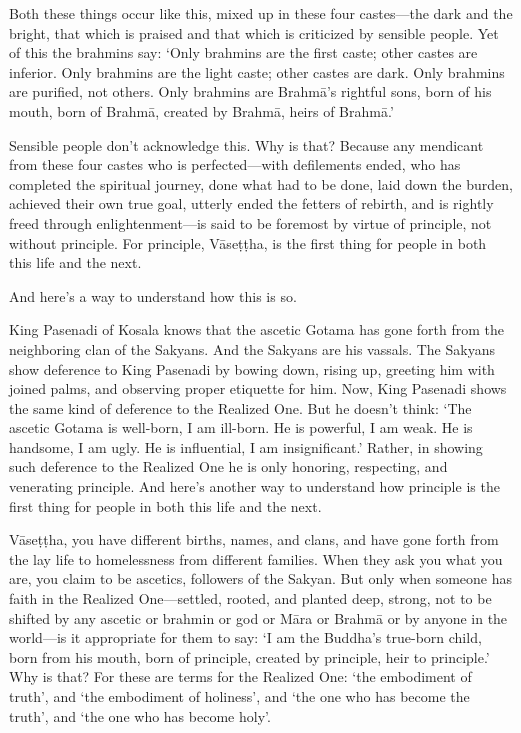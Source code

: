 \documentclass[12pt,openany]{book}%
\begin{document}
Both these things occur like this, mixed up in these four castes—the dark and the bright, that which is praised and that which is criticized by sensible people. Yet of this the brahmins say: ‘Only brahmins are the first caste; other castes are inferior. Only brahmins are the light caste; other castes are dark. Only brahmins are purified, not others. Only brahmins are \textsanskrit{Brahmā}’s rightful sons, born of his mouth, born of \textsanskrit{Brahmā}, created by \textsanskrit{Brahmā}, heirs of \textsanskrit{Brahmā}.’ 

Sensible people don’t acknowledge this. Why is that? Because any mendicant from these four castes who is perfected—with defilements ended, who has completed the spiritual journey, done what had to be done, laid down the burden, achieved their own true goal, utterly ended the fetters of rebirth, and is rightly freed through enlightenment—is said to be foremost by virtue of principle, not without principle. For principle, \textsanskrit{Vāseṭṭha}, is the first thing for people in both this life and the next. 

And here’s a way to understand how this is so. 

King Pasenadi of Kosala knows that the ascetic Gotama has gone forth from the neighboring clan of the Sakyans. And the Sakyans are his vassals. The Sakyans show deference to King Pasenadi by bowing down, rising up, greeting him with joined palms, and observing proper etiquette for him. Now, King Pasenadi shows the same kind of deference to the Realized One. But he doesn’t think: ‘The ascetic Gotama is well-born, I am ill-born. He is powerful, I am weak. He is handsome, I am ugly. He is influential, I am insignificant.’ Rather, in showing such deference to the Realized One he is only honoring, respecting, and venerating principle. And here’s another way to understand how principle is the first thing for people in both this life and the next. 

\textsanskrit{Vāseṭṭha}, you have different births, names, and clans, and have gone forth from the lay life to homelessness from different families. When they ask you what you are, you claim to be ascetics, followers of the Sakyan. But only when someone has faith in the Realized One—settled, rooted, and planted deep, strong, not to be shifted by any ascetic or brahmin or god or \textsanskrit{Māra} or \textsanskrit{Brahmā} or by anyone in the world—is it appropriate for them to say: ‘I am the Buddha’s true-born child, born from his mouth, born of principle, created by principle, heir to principle.’ Why is that? For these are terms for the Realized One: ‘the embodiment of truth’, and ‘the embodiment of holiness’, and ‘the one who has become the truth’, and ‘the one who has become holy’. 
\end{document}
